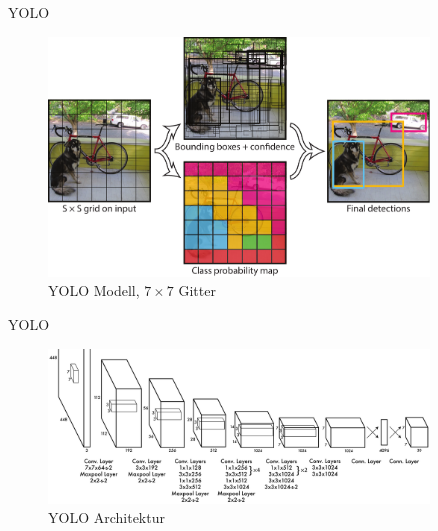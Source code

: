 \documentclass{beamer}
\begin{document}
\begin{frame}{YOLO}
    \begin{figure}
        \centering
        \includegraphics[width=0.9\textwidth]{./resources/images/redmon2016you_fig-2.pdf}
        \caption{YOLO Modell, $7 \times 7$ Gitter~\cite[Abb.~2]{redmon2016you}}
        \label{fig:yolo_model}
    \end{figure}
\end{frame}

\begin{frame}{YOLO}
    \begin{figure}
        \centering
        \includegraphics[width=0.9\textwidth]{./resources/images/redmon2016you_fig-3.pdf}
        \caption{YOLO Architektur~\cite[Abb.~3]{redmon2016you}}
        \label{fig:yolo_architecture}
    \end{figure}
\end{frame}
\end{document}
